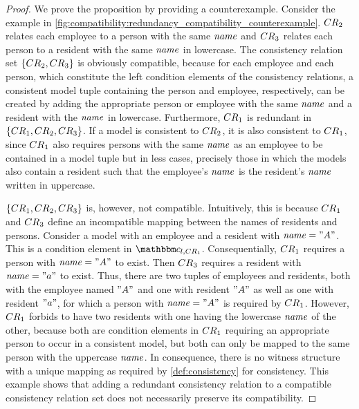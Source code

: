 \begin{proof}
We prove the proposition by providing a counterexample.
Consider the example in \autoref{fig:compatibility:redundancy_compatibility_counterexample}. 
$\consistencyrelation{CR}{2}$ relates each employee to a person with the same $\mathit{name}$ and $\consistencyrelation{CR}{3}$ relates each person to a resident with the same $\mathit{name}$ in lowercase.
The consistency relation set $\setted{\consistencyrelation{CR}{2}, \consistencyrelation{CR}{3}}$ is obviously compatible, because for each employee and each person, which constitute the left condition elements of the consistency relations, a consistent model tuple containing the person and employee, respectively, can be created by adding the appropriate person or employee with the same $\mathit{name}$ and a resident with the $\mathit{name}$ in lowercase.
Furthermore, $\consistencyrelation{CR}{1}$ is redundant in $\setted{\consistencyrelation{CR}{1}, \consistencyrelation{CR}{2}, \consistencyrelation{CR}{3}}$.
If a model is consistent to $\consistencyrelation{CR}{2}$, it is also consistent to $\consistencyrelation{CR}{1}$, since $\consistencyrelation{CR}{1}$ also requires persons with the same $\mathit{name}$ as an employee to be contained in a model tuple but in less cases, precisely those in which the models also contain a resident such that the employee's $\mathit{name}$ is the resident's $\mathit{name}$ written in uppercase.

$\setted{\consistencyrelation{CR}{1}, \consistencyrelation{CR}{2}, \consistencyrelation{CR}{3}}$ is, however, not compatible.
Intuitively, this is because $\consistencyrelation{CR}{1}$ and $\consistencyrelation{CR}{3}$ define an incompatible mapping between the names of residents and persons.
Consider a model with an employee and a resident with $\mathit{name} = "A"$. This is a condition element in $\condition{c}{l,\consistencyrelation{CR}{1}}$. 
Consequentially, $\consistencyrelation{CR}{1}$ requires a person with $\mathit{name} = "A"$ to exist. 
Then $\consistencyrelation{CR}{3}$ requires a resident with $\mathit{name} = "a"$ to exist.
Thus, there are two tuples of employees and residents, both with the employee named $"A"$ and one with resident $"A"$ as well as one with resident $"a"$, for which a person with $\mathit{name} = "A"$ is required by $\consistencyrelation{CR}{1}$.
However, $\consistencyrelation{CR}{1}$ forbids to have two residents with one having the lowercase $\mathit{name}$ of the other, because both are condition elements in $\consistencyrelation{CR}{1}$ requiring an appropriate person to occur in a consistent model, but both can only be mapped to the same person with the uppercase $\mathit{name}$.
In consequence, there is no witness structure with a unique mapping as required by \autoref{def:consistency} for consistency.
This example shows that adding a redundant consistency relation to a compatible consistency relation set does not necessarily preserve its compatibility.
\end{proof}

